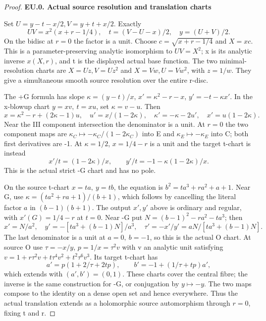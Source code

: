 \begin{proof}
\par

\medskip\noindent\textbf{EU.0. Actual source resolution and translation charts}

\par\nobreak

Set \(U=y-t-x/2,V=y+t+x/2\). Exactly
\[
 UV=x^2(x+r-1/4),\quad t=(V-U-x)/2,\quad y=(U+V)/2.
\]
On the bidisc at \(r=0\) the factor is a unit. Choose
\(c=\sqrt{x+r-1/4}\) and \(X=xc\). This is a parameter-preserving
analytic isomorphism to \(UV=X^2\); x is its analytic inverse
\(x(X,r)\), and t is the displayed actual base function. The
two minimal-resolution charts are \(X=Uz,V=Uz^2\) and
\(X=Vw,U=Vw^2\), with \(z=1/w\). They give a simultaneous smooth
source resolution over the entire r-disc.

The +G formula has slope \(\kappa=(y-t)/x\),
\(x'=\kappa^2-r-x\), \(y'=-t-\kappa x'\).
In the x-blowup chart \(y=xv,\ t=xu\), set \(\kappa=v-u\). Then
\[
 x=\kappa^2-r+(2\kappa-1)u,\quad
 u'=x/(1-2\kappa),\quad \kappa'=-\kappa-2u',\quad
 x'=u(1-2\kappa).
\]
Near the III component intersection the denominator is a unit.
At \(r=0\) the two component maps are
\(\kappa_C\mapsto-\kappa_C/(1-2\kappa_C)\) into E and
\(\kappa_E\mapsto-\kappa_E\) into C; both first derivatives
are -1. At \(\kappa=1/2\), \(x=1/4-r\) is a unit and the target
t-chart is instead
\[
 x'/t=(1-2\kappa)/x,\qquad y'/t=-1-\kappa(1-2\kappa)/x.
\]
This is the actual strict -G chart and has no pole.

On the source t-chart \(x=ta,\ y=tb\), the equation is
\(b^2=ta^3+ra^2+a+1\). Near G, use
\(\kappa=(ta^2+ra+1)/(b+1)\), which follows by cancelling
the literal factor \(a\) in \((b-1)(b+1)\). The output \(x',y'\) above is
ordinary and regular, with \(x'(G)=1/4-r\) at \(t=0\). Near -G put
\(N=(b-1)^2-ra^2-ta^3\); then
\[
 x'=N/a^2,\quad y'=-[ta^3+(b-1)N]/a^3,
 \quad \tau'=-x'/y'=aN/[ta^3+(b-1)N].
\]
The last denominator is a unit at \(a=0,\ b=-1\), so this is the actual
O chart. At source O use \(\tau=-x/y\), \(p=1/x=\tau^2v\)
with v an analytic unit satisfying
\(v=1+r\tau^2v+t\tau^4v^2+t^2\tau^6v^3\). Its target
t-chart has
\[
 a'=p(1+2/\tau+2tp),\qquad
 b'=-1+(1/\tau+tp)a',
\]
which extends with \((a',b')=(0,1)\). These charts cover the central
fibre; the inverse is the same construction for -G, or conjugation
by \(y\mapsto-y\). The two maps compose to the identity on a dense open
set and hence everywhere. Thus the actual translation extends as
a holomorphic source automorphism through \(r=0\), fixing t and r.


\end{proof}
